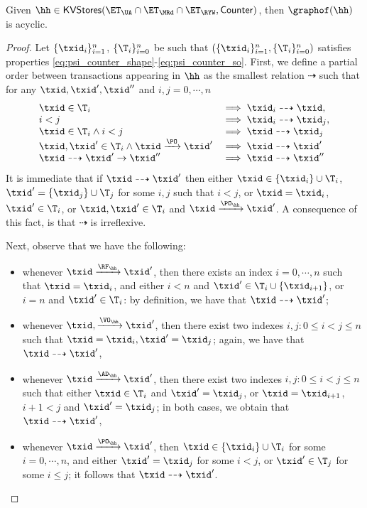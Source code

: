 \begin{corollary}
\label{cor:psi_counter_acyclic}
Given $\hh \in \mathsf{KVStores}(\ET_{\UA} \cap \ET_{\MRd} \cap \ET_{\RYW}, \mathsf{Counter})$, 
then $\graphof(\hh)$ is acyclic.
\end{corollary}

\begin{proof}
Let $\{\txid_{i}\}_{i=1}^{n}$, $\{\T_{i}\}_{i=0}^{n}$ 
be such that $(\{\txid_{i}\}_{i=1}^{n}, \{\T_{i}\}_{i=0}^{n})$ 
satisfies properties \eqref{eq:psi_counter_shape}-\eqref{eq:psi_counter_so}. 
First, we define a partial order between transactions appearing in $\hh$ 
as the smallest relation $\dashrightarrow$ such that for any $\txid, \txid', \txid''$ and 
$i,j = 0,\cdots, n$
\[
\begin{array}{ll}
\txid \in \T_{i} &\implies \txid_{i} \dashrightarrow \txid,\\
i < j &\implies \txid_{i} \dashrightarrow \txid_{j},\\
\txid \in \T_{i} \wedge i < j & \implies \txid \dashrightarrow \txid_{j}\\
\txid, \txid' \in \T_{i} \wedge \txid \xrightarrow{\PO} \txid' &\implies \txid \dashrightarrow \txid'\\
\txid \dashrightarrow \txid' \rightarrow \txid'' &\implies \txid \dashrightarrow \txid''
\end{array}
\]
It is immediate that if $\txid \dashrightarrow \txid'$ then either $\txid \in \{\txid_{i}\} \cup \T_i$, 
$\txid' = \{\txid_{j}\} \cup \T_{j}$ for some $i,j$ such that $i < j$, or $\txid = \txid_{i}$, $\txid' \in \T_i$, 
or $\txid, \txid' \in \T_{i}$ and $\txid \xrightarrow{\PO_{\hh}} \txid'$. A consequence of this fact, 
is that $\dashrightarrow$ is irreflexive.

Next, observe that we have the following: 
\begin{itemize}
\item whenever $\txid \xrightarrow{\RF_{\hh}} \txid'$, then 
there exists an index $i = 0,\cdots, n$ such that $\txid = \txid_{i}$, 
and either $i < n$ and $\txid' \in \T_{i} \cup \{ \txid_{i+1} \}$, 
or $i = n$ and $\txid' \in \T_{i}$: by definition, we have that $\txid \dashrightarrow \txid'$;
\item whenever $\txid, \xrightarrow{\VO_{\hh}} \txid'$, 
then there exist two indexes $i, j: 0 \leq i < j \leq n$ such that 
$\txid = \txid_{i}, \txid' = \txid_{j}$; again, we have that $\txid \dashrightarrow \txid'$, 
\item whenever $\txid \xrightarrow{\AD_{\hh}} \txid'$, then 
there exist two indexes $i, j: 0 \leq i < j \leq n$ such that either 
$\txid \in \T_{i}$ and $\txid' = \txid_{j}$, or $\txid = \txid_{i+1}$, 
$i+1 < j$ and $\txid' = \txid_{j}$; in both cases, we obtain that $\txid \dashrightarrow \txid'$,
\item whenever $\txid \xrightarrow{\PO_{\hh}} \txid'$, then 
$\txid \in \{\txid_{i}\} \cup \T_{i}$ for some $i=0,\cdots,n$, 
and either $\txid' = \txid_{j}$ for some $i < j$,  or $\txid' \in \T_{j}$ for 
some $i \leq j$; it follows that $\txid \dashrightarrow \txid'$.
\end{itemize}


\end{proof}
